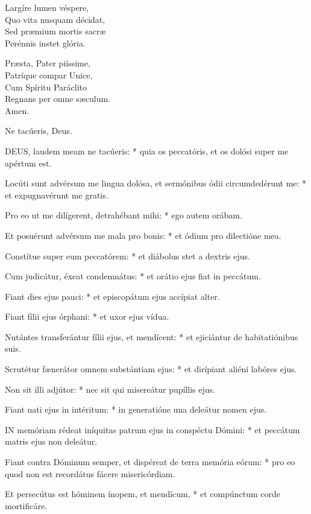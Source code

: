 Largíre lumen véspere,\\
Quo vita nusquam décidat,\\
Sed præmium mortis sacræ\\
Perénnis instet glória.

Præsta, Pater piíssime,\\
Patríque compar Unice,\\
Cum Spíritu Paráclito\\
Regnans per omne sæculum.\\
Amen.

 Ne tacúeris, Deus.


\lettrine[lines=2]{D}{EUS}, laudem meam ne tacúeris: * quia os peccatóris, et os dolósi super me apértum est.

Locúti sunt advérsum me lingua dolósa, et sermónibus ódii circumdedérunt me: * et expugnavérunt me gratis.

Pro eo ut me dilígerent, detrahébant mihi: * ego autem orábam.

Et posuérunt advérsum me mala pro bonis: * et ódium pro dilectióne mea.

Constítue super eum peccatórem: * et diábolus stet a dextris ejus.

Cum judicátur, éxeat condemnátus: * et orátio ejus fiat in peccátum.

Fiant dies ejus pauci: * et episcopátum ejus accípiat alter.

Fiant fílii ejus órphani: * et uxor ejus vídua.

Nutántes transferántur fílii ejus, et mendícent: * et ejiciántur de habitatiónibus suis.

Scrutétur fænerátor omnem substántiam ejus: * et dirípiant aliéni labóres ejus.

Non sit illi adjútor: * nec sit qui misereátur pupíllis ejus.

Fiant nati ejus in intéritum: * in generatióne una deleátur nomen ejus.


\lettrine[lines=2]{I}{N} memóriam rédeat iníquitas patrum ejus in conspéctu Dómini: * et peccátum matris ejus non deleátur.

Fiant contra Dóminum semper, et dispéreat de terra memória eórum: * pro eo quod non est recordátus fácere misericórdiam.

Et persecútus est hóminem ínopem, et mendícum, * et compúnctum corde mortificáre.

